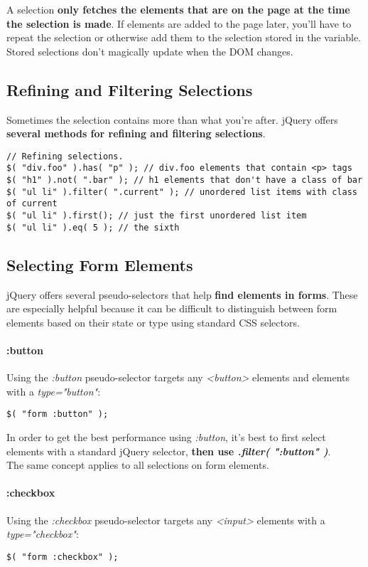 \documentclass[10pt,letterpaper]{book}
\begin{document}
A selection \textbf{only fetches the elements that are on the page at the time the selection is made}. If elements are added to the page later, you'll have to repeat the selection or otherwise add them to the selection stored in the variable. Stored selections don't magically update when the DOM changes.

\subsection{Refining and Filtering Selections}
Sometimes the selection contains more than what you're after. jQuery offers \textbf{several methods for refining and filtering selections}.
\begin{lstlisting}
// Refining selections.
$( "div.foo" ).has( "p" ); // div.foo elements that contain <p> tags
$( "h1" ).not( ".bar" ); // h1 elements that don't have a class of bar
$( "ul li" ).filter( ".current" ); // unordered list items with class of current
$( "ul li" ).first(); // just the first unordered list item
$( "ul li" ).eq( 5 ); // the sixth
\end{lstlisting}
\subsection{Selecting Form Elements}
jQuery offers several pseudo-selectors that help \textbf{find elements in forms}. These are especially helpful because it can be difficult to distinguish between form elements based on their state or type using standard CSS selectors.
\paragraph{:button}

Using the \textit{:button} pseudo-selector targets any \textit{<button>} elements and elements with a \textit{type="button"}:
\begin{lstlisting}
$( "form :button" );
\end{lstlisting}
In order to get the best performance using \textit{:button}, it's best to first select elements with a standard jQuery selector, \textbf{then use \textit{.filter( ":button" )}}.\\
The same concept applies to all selections on form elements.
\paragraph{:checkbox}
Using the \textit{:checkbox} pseudo-selector targets any \textit{<input>} elements with a \textit{type="checkbox"}:
\begin{lstlisting}
$( "form :checkbox" );
\end{lstlisting}
\end{document}
